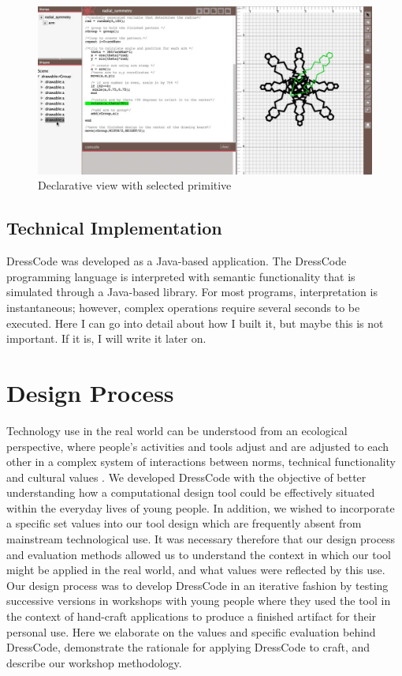 \documentclass{sigchi}
\begin{document}
\begin{center}
\begin{figure}[h!]
\includegraphics[width=\columnwidth]{images/selection_mechanism.jpg}
\caption{Declarative view with selected primitive}
\label{fig:declarative_view}
\end{figure}
\end{center}
\vspace{-20pt}

\subsection{Technical Implementation}
DressCode was developed as a Java-based application. The DressCode programming language is interpreted with semantic functionality that is simulated through a Java-based library. For most programs, interpretation is instantaneous; however, complex operations require several seconds to be executed. Here I can go into detail about how I built it, but maybe this is not important. If it is, I will write it later on. 

\section{Design Process}
 Technology use in the real world can be understood from an ecological perspective, where people's activities and tools adjust and are adjusted to each other in a complex system of interactions between norms, technical functionality and cultural values \cite{information_ecologies}. We developed DressCode with the objective of better understanding how a computational design tool could be effectively situated within the everyday lives of young people. In addition, we wished to incorporate a specific set values into our tool design which are frequently absent from mainstream technological use. It was necessary therefore that our design process and evaluation methods allowed us to understand the context in which our tool might be applied in the real world, and what values were reflected by this use. Our design process was to develop DressCode in an iterative fashion by testing successive versions in workshops with young people where they used the tool in the context of hand-craft applications to produce a finished artifact for their personal use. Here we elaborate on the values and specific evaluation behind DressCode, demonstrate the rationale for applying DressCode to craft, and describe our workshop methodology.
\end{document}
